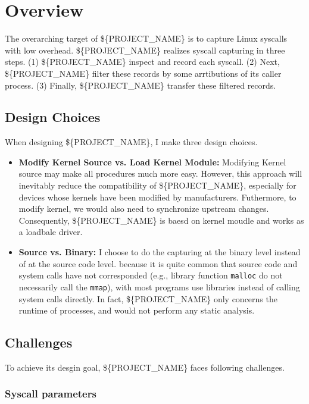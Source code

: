 \section{Overview}

The overarching target of \$\{PROJECT\_NAME\} is to capture Linux syscalls with low overhead. \$\{PROJECT\_NAME\} realizes syscall capturing in three steps. (1) \$\{PROJECT\_NAME\} inspect and record each syscall. (2) Next, \$\{PROJECT\_NAME\} filter these records by some arrtibutions of its caller process. (3) Finally, \$\{PROJECT\_NAME\} transfer these filtered records.

\subsection{Design Choices}

When designing \$\{PROJECT\_NAME\}, I make three design choices.

\begin{itemize}
    \item \textbf{Modify Kernel Source vs. Load Kernel Module:} Modifying Kernel source may make all procedures much more easy. However, this approach will inevitably reduce the compatibility of \$\{PROJECT\_NAME\}, especially for devices whose kernels have been modified by manufacturers. Futhermore, to modify kernel, we would also need to synchronize upstream changes. Consequently, \$\{PROJECT\_NAME\} is baesd on kernel moudle and works as a loadbale driver.
    \item \textbf{Source vs. Binary: }  I choose to do the capturing at
    the binary level instead of at the source code level. because it is quite common that source code and system calls have not corresponded (e.g., library function \texttt{malloc} do not necessarily call the \texttt{mmap}), with most programs use libraries instead of calling system calls directly. In fact, \$\{PROJECT\_NAME\} only concerns the runtime of processes, and would not perform any static analysis.
\end{itemize}

\subsection{Challenges}

To achieve its desgin goal, \$\{PROJECT\_NAME\} faces following challenges.


\subsubsection{Syscall parameters}


